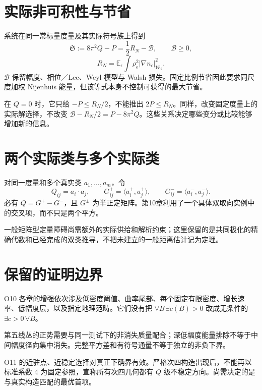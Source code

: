 \documentclass[UTF8,11pt,openany,oneside,fontset=none]{ctexbook}
\begin{document}
\section{实际非可积性与节省}\label{ch11:ux5b9eux9645ux975eux53efux79efux6027ux4e0eux8282ux7701}

系统在同一常标量度量及其实际符号族上得到 \[
\mathfrak S:=8\pi^2Q-P=\frac12R_N-\mathcal B,
\qquad\mathcal B\ge0,
\] \[
R_N=\mathbb E_\epsilon\int\rho_\epsilon^2
|\nabla n_\epsilon|_{\mathcal W_2}^2.
\] \(\mathcal B\) 保留幅度、相位／Lee、Weyl 模型与 Walsh 损失。固定比例节省因此要求同尺度加权 Nijenhuis 能量，但该等式本身不控制可获得的最大节省。\cite{Field,System}

在 \(Q=0\) 时，它只给 \(-P\le R_N/2\)，不能推出 \(2P\le R_N\)。同样，改变固定度量上的实际解选择，不改变 \(\mathcal B-R_N/2=P-8\pi^2Q\)。这些关系决定哪些变分或比较能够增加新的信息。

\section{两个实际类与多个实际类}\label{ch11:ux4e24ux4e2aux5b9eux9645ux7c7bux4e0eux591aux4e2aux5b9eux9645ux7c7b}

对同一度量和多个真实类 \(a_1,\ldots,a_m\)，令 \[
Q_{ij}=a_i\cdot a_j,\qquad
G_{ij}^+=\langle a_i^+,a_j^+\rangle,
\qquad G_{ij}^-=\langle a_i^-,a_j^-\rangle.
\] 必有 \(Q=G^+-G^-\)，且 \(G^\pm\) 为半正定矩阵。第10章利用了一个具体双取向实例中的交叉项，而不只是两个平方。

一般矩阵型定量障碍尚需额外的实际供给和解析约束；这里保留的是共同极化的精确代数和已经完成的双类推导，不把未建立的一般距离估计记为定理。

\section{保留的证明边界}\label{ch11:ux4fddux7559ux7684ux8bc1ux660eux8fb9ux754c}

O10 各章的增强依次涉及低密度阈值、曲率尾部、每个固定有限密度、增长速率、低幅度层，以及指定地理范畴。它们没有把 \(\forall B\,\exists c(B)>0\) 改成无条件的 \(\exists c>0\,\forall B\)。

第五线丛的正势需要与同一测试下的非消失质量配合；深低幅度能量排除不等于中间幅度径向集中消失。完整平方差和有符号通量不等于独立的非负下界。

O11 的近驻点、近稳定选择对真正下确界有效。严格次四构造出现后，不能再以标准系数 \(4\) 为固定参照，宣称所有次四几何都有 \(Q\) 级不稳定方向。尚需决定的是与真实构造匹配的最优首项。
\end{document}
